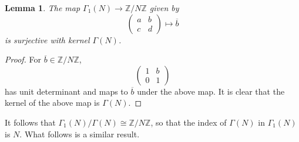 \documentclass[10pt,leqno,twoside]{article}
\theoremstyle{plain}
\newtheorem{lemma}[lem]{Lemma}
\theoremstyle{definition}
\numberwithin{equation}{section}
\numberwithin{lem}{section}
\newcommand{\smod}[1]{\;(\bmod\; #1)}
\newcommand{\abcd}{\begin{pmatrix}
    a & b \\ c & d
\end{pmatrix}}
\begin{document}
\begin{lemma}\label{lem: principal normal in gamma 1}
    The map $\varGamma_1(N)\to \mathbb{Z}/N\mathbb{Z}$ given by \[\abcd\mapsto \overline b\] is surjective with kernel $\varGamma(N)$. 
\end{lemma}
\begin{proof}
    For $\overline b\in\mathbb{Z}/N\mathbb{Z}$, \[\begin{pmatrix}
        1 & b \\ 0 & 1
    \end{pmatrix}\] has unit determinant and maps to $\overline b$ under the above map. It is clear that the kernel of the above map is $\varGamma(N)$.
\end{proof} 
It follows that $\varGamma_1(N)/\varGamma(N)\cong \mathbb{Z}/N\mathbb{Z}$, so that the index of $\varGamma(N)$ in $\varGamma_1(N)$ is $N$. What follows is a similar result.
\end{document}
